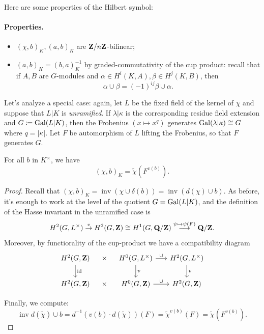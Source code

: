 \documentclass{article}
\begin{document}
Here are some properties of the Hilbert symbol:
\paragraph{Properties.}
\begin{itemize}
		\item $(\chi, b)_K, (a, b)_K$ are $\mathbf{Z}/n\mathbf{Z}$-bilinear;
		\item $(a,b)_K=(b,a)^{-1}_K$ by graded-commutativity of the cup product: recall that if $A,B$ are $G$-modules and $\alpha\in H^i(K,A),\beta\in H^j(K,B)$, then
		\[
			\alpha \cup \beta = (-1)^{ij} \beta \cup \alpha.
		\]
\end{itemize}

Let's analyze a special case: again, let $L$ be the fixed field of the kernel of $\chi$ and suppose that $L|K$ is \emph{unramified}. If $\lambda|\kappa$ is the corresponding residue field extension and $G\coloneqq \operatorname{Gal}(L|K)$, then the Frobenius $(x\mapsto x^q)$ generates $\operatorname{Gal}(\lambda|\kappa)\cong G$ where $q=|\kappa|$. Let $F$ be automorphism of $L$ lifting the Frobenius, so that $F$ generates $G$. 
\begin{prop}
		For all $b$ in $K^\times$, we have
		\begin{equation}\label{eq:unramifiedhilb}
			(\chi, b)_K=\widetilde{\chi}(F^{v(b)}).	
		\end{equation}
			
\end{prop}
\begin{proof}
		Recall that $(\chi,b)_K=\operatorname{inv}(\chi\cup \delta(b))=\operatorname{inv}(d(\chi)\cup b)$. As before, it's enough to work at the level of the quotient $G=\operatorname{Gal}(L|K)$, and the definition of the Hasse invariant in the unramified case is 
		\[
			H^2(G,L^\times)\overset{v}{\to} H^2(G,\mathbf{Z})\cong H^1(G,\mathbf{Q}/\mathbf{Z}) \overset{\psi \mapsto \psi(F)}{\longrightarrow} \mathbf{Q}/\mathbf{Z}.
		\]
		Moreover, by functiorality of the cup-product we have a compatibility diagram
		\[
\begin{tikzcd}[column sep=0.8em]
H^2(G,\Z)
  \arrow[d, "\id"]
&
\times
&
H^0(G,L^\times)\arrow[d, "v"]
	\arrow[rr, "\cup"]
&
&
H^2(G,L^\times)
  \arrow[d, "v"]
\\
H^2(G,\Z)
&
\times
&
H^0(G,\Z)
	\arrow[rr, "\cup"]
&
&
H^2(G,\Z)
\end{tikzcd}
\]

		Finally, we compute:
		\[
			\operatorname{inv}{d(\widetilde{\chi})\cup b} = d^{-1}(v(b)\cdot d(\widetilde{\chi}))(F) = \widetilde{\chi}^{v(b)}(F) = \widetilde{\chi}(F^{v(b)}).
		\]

\end{proof}
\end{document}

